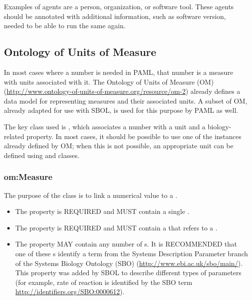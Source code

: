 Examples of agents are a person, organization, or software tool. 
These agents should be annotated with additional information, such as software version, needed to be able to run the same  again.



\subsection{Ontology of Units of Measure}

In most cases where a number is needed in PAML, that number is a measure with units associated with it.
The Ontology of Units of Measure (OM) (\url{http://www.ontology-of-units-of-measure.org/resource/om-2}) already defines a data model for representing measures and their associated units. 
A subset of OM, already adapted for use with SBOL, is used for this purpose by PAML as well.

The key class used is , which associates a number with a unit and a biology-related property.
In most cases, it should be possible to use one of the  instances already defined by OM; when this is not possible, an appropriate unit can be defined using  and  classes.

\subsubsection{om:Measure} \label{sec:om:Measure}

The purpose of the  class is to link a numerical value to a . 

\begin{itemize}
\item \label{sec:om:hasNumericalValue}
The  property is REQUIRED and MUST contain a single .

\item \label{sec:om:hasUnit:Measure}
The  property is REQUIRED and MUST contain a  that refers to a . 

\item \label{sec:sbol:type:Measure}
The  property MAY contain any number of s. It is RECOMMENDED that one of these s identify a term from the Systems Description Parameter branch of the Systems Biology Ontology (SBO) (\url{http://www.ebi.ac.uk/sbo/main/}). This  property was added by SBOL to describe different types of parameters 
(for example, rate of reaction is identified by the SBO term \url{http://identifiers.org/SBO:0000612}).
\end{itemize}

